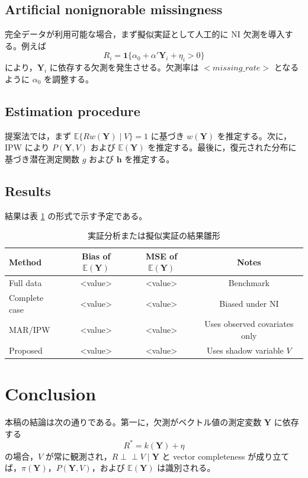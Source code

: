 \documentclass[10pt,a4paper]{article}
\newcommand{\indep}{\mathrel{\perp\!\!\!\perp}}
\newcommand{\E}{\mathbb{E}}
\newcommand{\1}{\mathbf{1}}
\newcommand{\Y}{\bm{Y}}
\begin{document}
\subsection{Artificial nonignorable missingness}

完全データが利用可能な場合，まず擬似実証として人工的に NI 欠測を導入する。例えば
\begin{equation}
  R_i=\1\{\alpha_0+\alpha'\Y_i+\eta_i>0\}
\end{equation}
により，$\Y_i$ に依存する欠測を発生させる。欠測率は $<missing\_rate>$ となるように $\alpha_0$ を調整する。

\subsection{Estimation procedure}

提案法では，まず $\E\{Rw(\Y)\mid V\}=1$ に基づき $w(\Y)$ を推定する。次に，IPW により $P(\Y,V)$ および $\E(\Y)$ を推定する。最後に，復元された分布に基づき潜在測定関数 $g$ および $\bm h$ を推定する。

\subsection{Results}

結果は表 \ref{tab:empirical-template} の形式で示す予定である。

\begin{table}[tbp]
\centering
\caption{実証分析または擬似実証の結果雛形}
\label{tab:empirical-template}
\begin{tabular}{lccc}
\hline
Method & Bias of $\E(\Y)$ & MSE of $\E(\Y)$ & Notes\\
\hline
Full data & <value> & <value> & Benchmark\\
Complete case & <value> & <value> & Biased under NI\\
MAR/IPW & <value> & <value> & Uses observed covariates only\\
Proposed & <value> & <value> & Uses shadow variable $V$\\
\hline
\end{tabular}
\end{table}

\section{Conclusion}

本稿の結論は次の通りである。第一に，欠測がベクトル値の測定変数 $\Y$ に依存する
\begin{equation}
  R^*=k(\Y)+\eta
\end{equation}
の場合，$V$ が常に観測され，$R\indep V\mid \Y$ と vector completeness が成り立てば，$\pi(\Y)$，$P(\Y,V)$，および $\E(\Y)$ は識別される。
\end{document}

